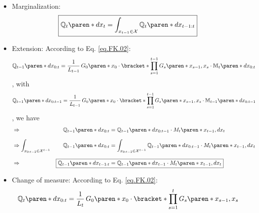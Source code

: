\begin{itemize}
    \item Marginalization:
    \begin{equation} \label{eq.forward.marginal}
        \boxed{
            \mathbb{Q}_{t} \paren*{dx_{t}} =
                \int_{x_{t-1} \in \mathcal{X}}
                \mathbb{Q}_{t} \paren*{dx_{t-1:t}}
        }
    \end{equation}
    \item Extension: According to Eq. \eqref{eq.FK.02}:
    \begin{equation*}
        \mathbb{Q}_{t-1} \paren*{dx_{0:t}} =
            \dfrac{1}{L_{t-1}} \,
            G_{0} \paren*{x_{0}} \cdot \bracket*{
                \prod_{s = 1}^{{t-1}} G_{s} \paren*{x_{s - 1}, x_{s}}
            }
            \cdot \mathbb{M}_{t} \paren*{dx_{0:t}}
    \end{equation*}
    , with
    \begin{equation*}
        \mathbb{Q}_{t-1} \paren*{dx_{0:t-1}} =
            \dfrac{1}{L_{t-1}} \,
            G_{0} \paren*{x_{0}} \cdot \bracket*{
                \prod_{s = 1}^{{t-1}} G_{s} \paren*{x_{s - 1}, x_{s}}
            }
            \cdot \mathbb{M}_{t-1} \paren*{dx_{0:t-1}}
    \end{equation*}
    , we have
    \begin{alignat}{3}
        & \Rightarrow &
        \mathbb{Q}_{t-1} \paren*{dx_{0:t}} &=
            \mathbb{Q}_{t-1} \paren*{dx_{0:t-1}}
            \cdot M_{t} \paren*{x_{t-1}, dx_{t}}
        \nonumber \\[1.5ex] & \Rightarrow
        \int_{x_{0:t-2} \in \mathcal{X}^{t-1}} &
            \mathbb{Q}_{t-1} \paren*{dx_{0:t}} &=
            \int _{x_{0:t-2} \in \mathcal{X}^{t-1}}
            \mathbb{Q}_{t-1} \paren*{dx_{0:t-1}}
            \cdot M_{t} \paren*{x_{t-1}, dx_{t}}
        \nonumber \\[1.5ex] & \Rightarrow &
        \Aboxed{
            \mathbb{Q}_{t-1} \paren*{dx_{t-1:t}} &=
                \mathbb{Q}_{t-1} \paren*{dx_{t-1}}
                \cdot M_{t} \paren*{x_{t-1}, dx_{t}}
        }
        \label{eq.forward.extend}
    \end{alignat}
    \item Change of measure: According to Eq. \eqref{eq.FK.02}:
    \begin{equation*}
        \mathbb{Q}_{t} \paren*{dx_{0:t}} =
            \dfrac{1}{L_{t}} \,
            G_{0} \paren*{x_{0}} \cdot \bracket*{
                \prod_{s = 1}^{{t}} G_{s} \paren*{x_{s - 1}, x_{s}}
}
\end{equation*}
\end{itemize}
